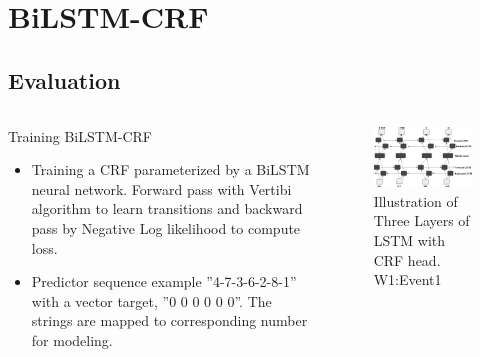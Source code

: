 \documentclass{beamer}
\begin{document}
\section{BiLSTM-CRF}
\subsection{Evaluation}
\begin{frame} %
\begin{columns}
\begin{column}{0.5\textwidth}
\begin{block}{\scriptsize Training BiLSTM-CRF}
   \begin{itemize}
        \scriptsize
        \item Training a CRF parameterized by a BiLSTM neural network. Forward pass with Vertibi algorithm to learn transitions and backward pass by Negative Log likelihood to compute loss.
        \item Predictor sequence example ”4-7-3-6-2-8-1” with a vector
target, ”0 0 0 0 0 0”. The strings are mapped to corresponding number for
modeling.
\end{itemize}
\end{block}
\end{column}
\begin{column}{0.5\textwidth}  %
    \begin{center}
     \begin{figure}[!h]
            \includegraphics[scale = .27]{bilstm_crf.png}
            \centering
            \caption{\scriptsize Illustration of Three Layers of LSTM with CRF head. W1:Event1}
            \label{fig1}
    \end{figure}
    \end{center}
\end{column}
\end{columns}


\end{frame}
\end{document}
